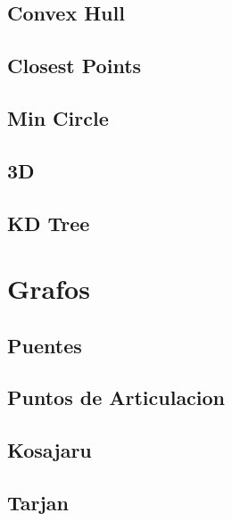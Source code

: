 \subsection{Convex Hull}
\raggedbottom
\hrulefill
\subsection{Closest Points}
\raggedbottom
\hrulefill
\subsection{Min Circle}
\raggedbottom
\hrulefill
\subsection{3D}
\raggedbottom
\hrulefill
\subsection{KD Tree}
\raggedbottom
\hrulefill

\section{Grafos}
\subsection{Puentes}
\raggedbottom
\hrulefill
\subsection{Puntos de Articulacion}
\raggedbottom
\hrulefill
\subsection{Kosajaru}
\raggedbottom
\hrulefill
\subsection{Tarjan}
\raggedbottom
\hrulefill
